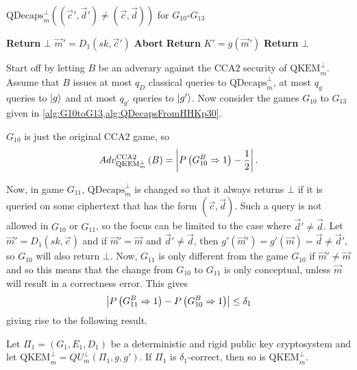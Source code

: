 \begin{center}
\begin{minipage}[ht!]{0.7\textwidth}
	\begin{algorithm}[H]
		\centering
		\caption{$\mathrm{QDecaps}^{\bot}_{m}\left(\left(\vec{c}', \vec{d}'\right) \neq \left(\vec{c}, \vec{d}\right)\right)$ for $G_{10}$-$G_{13}$}
		\label{alg:QDecapsFromHHKp30}
		\begin{algorithmic}
			 
				\State \textbf{Return} $\bot$ 
			\EndIf {}
			\State $\vec{m}' = D_1\left( sk, \vec{c}' \right)$
			 
				\State \textbf{Abort} 
			\EndIf {}
				\State \textbf{Return} $K' = g\left( \vec{m}' \right)$
			\Else
				\State \textbf{Return} $\bot$
			\EndIf
		\end{algorithmic}
	\end{algorithm}
\end{minipage}
\end{center}

Start off by letting $B$ be an adverary against the $\mathrm{CCA}2$ security of $\mathrm{QKEM}^{\bot}_m$. Assume that $B$ issues at most $q_D$ classical queries to $\mathrm{QDecaps}^{\bot}_{m}$, at most $q_g$ queries to $\lvert g\rangle$ and at most $q_{g'}$ queries to $\lvert g'\rangle$. Now consider the games $G_{10}$ to $G_{13}$ given in \cref{alg:G10toG13,alg:QDecapsFromHHKp30}.

$G_{10}$ is just the original $\mathrm{CCA}2$ game, so
\[
	Adv_{\mathrm{QKEM}^{\bot}_m}^{\mathrm{CCA}2}\left(B\right) = \left\vert P\left( G_{10}^B \Rightarrow 1 \right) - \frac{1}{2}  \right\vert.
\]

Now, in game $G_{11}$, $\mathrm{QDecaps}^{\bot}_{m}$ is changed so that it always returns $\bot$ if it is queried on some ciphertext that has the form $\left(\vec{c}, \vec{d}\right)$. Such a query is not allowed in $G_{10}$ or $G_{11}$, so the focus can be limited to the case where $\vec{d}' \neq \vec{d}$. Let $\vec{m}' = D_1\left(sk, \vec{c}\right)$ and if $\vec{m}' = \vec{m}$ and $\vec{d}' \neq \vec{d}$, then $g'\left(\vec{m}'\right) = g'\left(\vec{m}\right) = \vec{d} \neq \vec{d}'$, so $G_{10}$ will also return $\bot$. Now, $G_{11}$ is only different from the game $G_{10}$ if $\vec{m}' \neq \vec{m}$ and so this means that the change from $G_{10}$ to $G_{11}$ is only conceptual, unless $\vec{m}$ will result in a correctness error. This gives
\[
	\left\vert P\left( G_{11}^B \Rightarrow 1 \right) - P\left( G_{10}^B \Rightarrow1 \right) \right\vert \leq \delta_1
\]
giving rise to the following result.
\begin{thm}
	Let $\Pi_1 = \left(G_1, E_1, D_1\right)$ be a deterministic and rigid public key cryptosystem and let $\mathrm{QKEM}^{\bot}_m = QU^{\bot}_m \left(\Pi_1, g, g'\right)$. If $\Pi_1$ is $\delta_1$-correct, then so is $\mathrm{QKEM}^{\bot}_m$.
\end{thm}


